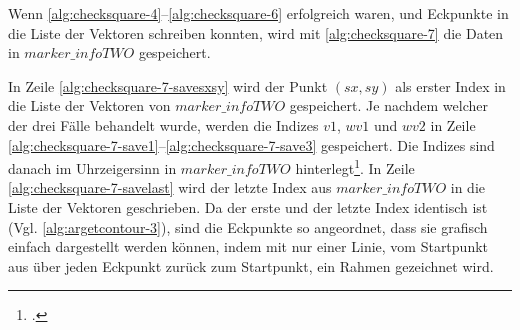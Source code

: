 


Wenn \autoref{alg:checksquare-4}--\autoref{alg:checksquare-6} erfolgreich waren, und Eckpunkte in die Liste der
 Vektoren schreiben konnten, wird mit \autoref{alg:checksquare-7} die Daten in $\mathit{marker\_infoTWO}$ gespeichert.



In Zeile \ref{alg:checksquare-7-savesxsy} wird der Punkt $(\mathit{sx},\mathit{sy})$ als erster Index in die Liste der
 Vektoren von $\mathit{marker\_infoTWO}$ gespeichert. Je nachdem welcher der drei Fälle behandelt wurde, werden die
 Indizes $\mathit{v1}$, $\mathit{wv1}$ und $\mathit{wv2}$ in Zeile
 \ref{alg:checksquare-7-save1}--\ref{alg:checksquare-7-save3} gespeichert. Die Indizes sind danach im Uhrzeigersinn in
 $\mathit{marker\_infoTWO}$ hinterlegt\footcite[Vgl.][S.~44]{wagner07a}. In Zeile \ref{alg:checksquare-7-savelast} wird
 der letzte Index aus $\mathit{marker\_infoTWO}$ in die Liste der Vektoren geschrieben. Da der erste und der letzte
 Index identisch ist (Vgl. \autoref{alg:argetcontour-3}), sind die Eckpunkte so angeordnet, dass sie grafisch einfach
 dargestellt werden können, indem mit nur einer Linie, vom Startpunkt aus über jeden Eckpunkt zurück zum Startpunkt,
 ein Rahmen gezeichnet wird.



